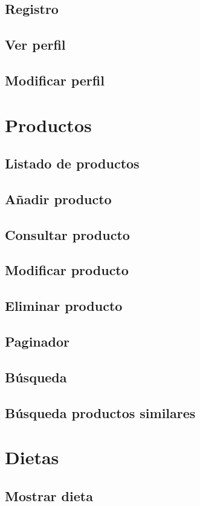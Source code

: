 \subsection{Registro}
\subsection{Ver perfil}
\subsection{Modificar perfil}

\section{Productos}
\subsection{Listado de productos}
\subsection{Añadir producto}
\subsection{Consultar producto}
\subsection{Modificar producto}
\subsection{Eliminar producto}
\subsection{Paginador}
\subsection{Búsqueda}
\subsection{Búsqueda productos similares}

\section{Dietas}
\subsection{Mostrar dieta}
